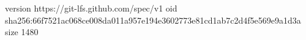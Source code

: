 version https://git-lfs.github.com/spec/v1
oid sha256:66f7521ac068ce008da011a957e194e3602773e81cd1ab7c2d4f5e569e9a1d3a
size 1480
